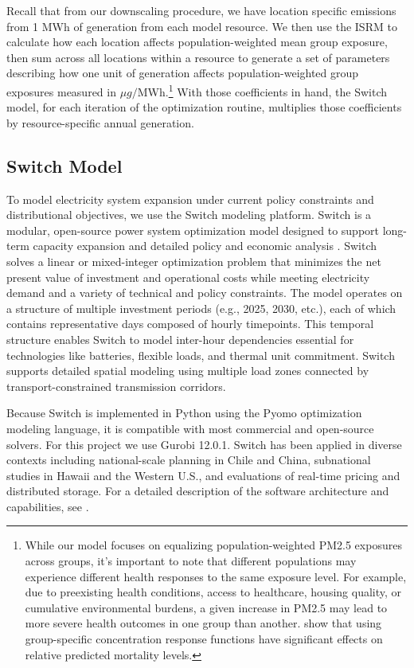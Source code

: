\documentclass[a4paper]{article}
\theoremstyle{definition}
\theoremstyle{plain}
\begin{document}
Recall that from our downscaling procedure, we have location specific emissions from 1 MWh of generation from each model resource. We then use the ISRM to calculate how each location affects population-weighted mean group exposure, then sum across all locations within a resource to generate a set of parameters describing how one unit of generation affects population-weighted group exposures measured in $\mu g/$MWh.\footnote{While our model focuses on equalizing population-weighted PM2.5 exposures across groups, it’s important to note that different populations may experience different health responses to the same exposure level. For example, due to preexisting health conditions, access to healthcare, housing quality, or cumulative environmental burdens, a given increase in PM2.5 may lead to more severe health outcomes in one group than another. \citet{Spiller2021MortalityOutcomes} show that using group-specific concentration response functions have significant effects on relative predicted mortality levels.} With those coefficients in hand, the Switch model, for each iteration of the optimization routine, multiplies those coefficients by resource-specific annual generation.

\subsection{Switch Model}

To model electricity system expansion under current policy constraints and distributional objectives, we use the Switch modeling platform. Switch is a modular, open-source power system optimization model designed to support long-term capacity expansion and detailed policy and economic analysis
\citep{Johnston2019SwitchSystems}. Switch solves a linear or mixed-integer optimization problem that minimizes the net present value of investment and operational costs while meeting electricity demand and a variety of technical and policy constraints. The model operates on a structure of multiple investment periods (e.g., 2025, 2030, etc.), each of which contains representative days composed of hourly timepoints. This temporal structure enables Switch to model inter-hour dependencies essential for technologies like batteries, flexible loads, and thermal unit commitment. Switch supports detailed spatial modeling using multiple load zones connected by transport-constrained transmission corridors.

Because Switch is implemented in Python using the Pyomo optimization modeling language, it is compatible with most commercial and open-source solvers. For this project we use Gurobi 12.0.1. Switch has been applied in diverse contexts including national-scale planning in Chile and China, subnational studies in Hawaii and the Western U.S., and evaluations of real-time pricing and distributed storage. For a detailed description of the software architecture and capabilities, see \citet{Johnston2019SwitchSystems}.
\end{document}
